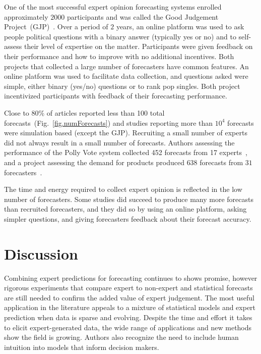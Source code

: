 \documentclass[preprint,authoryear]{elsarticle}
\begin{document}
One of the most successful expert opinion forecasting systems enrolled approximately $2000$ participants and was called the Good Judgement Project~(GJP)~\citep{mellers2014psychological,ungar2012good,satopaa2014probability}.
Over a period of $2$ years, an online platform was used to ask people political questions with a binary answer (typically yes or no) and to self-assess their level of expertise on the matter.
Participants were given feedback on their performance and how to improve with no additional incentives.
Both projects that collected a large number of forecasters have common features.
An online platform was used to facilitate data collection, and questions asked were simple, either binary (yes/no) questions or to rank pop singles. 
Both project incentivized participants with feedback of their forecasting performance.

Close to 80\% of articles reported less than 100 total forecasts~(Fig.~\ref{fig.numForecasts}) and studies reporting more than $10^4$ forecasts were simulation based (except the GJP).
Recruiting a small number of experts did not always result in a small number of forecasts.
Authors assessing the performance of the Polly Vote system collected 452 forecasts from 17 experts~\citep{graefe2014accuracy,graefe2015accuracy,graefe2018predicting}, and
a project assessing the demand for products produced $638$ forecasts from $31$ forecasters~\citep{alvarado2017expertise}.

The time and energy required to collect expert opinion is reflected in the low number of forecasters. 
Some studies did succeed to produce many more forecasts than recruited forecasters, and they did so by using an online platform, asking simpler questions, and giving forecasters feedback about their forecast accuracy.

\section{Discussion}


\label{sec.discussion}

Combining expert predictions for forecasting continues to shows promise, however rigorous experiments that compare expert to non-expert and statistical forecasts are still needed to confirm the added value of expert judgement.
The most useful application in the literature appeals to a mixture of statistical models and expert prediction when data is sparse and evolving.
Despite the time and effort it takes to elicit expert-generated data, the wide range of applications and new methods show the field is growing.
Authors also recognize the need to include human intuition into models that inform decision makers.
\end{document}
